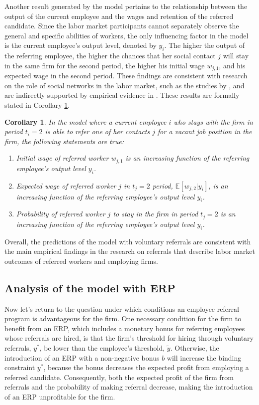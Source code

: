 \documentclass[12pt]{article}
\newtheorem{corollary}[theorem]{Corollary}
\begin{document}
Another result generated by the model pertains to the relationship between the output of the current employee and the wages and retention of the referred candidate. Since the labor market participants cannot separately observe the general and specific abilities of workers, the only influencing factor in the model is the current employee's output level, denoted by $y_i$. The higher the output of the referring employee, the higher the chances that her social contact $j$ will stay in the same firm for the second period, the higher his initial wage $w_{j,1}$, and his expected wage in the second period. These findings are consistent with research on the role of social networks in the labor market, such as the studies by \cite{saloner1985old, simon1992matchmaker}, and are indirectly supported by empirical evidence in \cite{pallais2016referential, lalanne2016old, levati2020impact}. These results are formally stated in Corollary \ref{cor:relation_current_empl}.
\begin{corollary}\label{cor:relation_current_empl}
    In the model where a current employee $i$ who stays with the firm in period $t_i = 2$ is able to refer one of her contacts $j$ for a vacant job position in the firm, the following statements are true:
    \begin{enumerate}[label={\roman*})]
        \item Initial wage of referred worker $w_{j,1}$ is an increasing function of the referring employee's output level $y_i$.
        \item Expected wage of referred worker $j$ in $t_j = 2$ period,  $\mathbb{E}[w_{j,2}|y_i]$, is an increasing function of the referring employee's output level $y_i$.
        \item Probability of referred worker $j$ to stay in the firm in period $t_j = 2$ is an increasing function of the referring employee's output level $y_i$.
    \end{enumerate}
\end{corollary}

Overall, the predictions of the model with voluntary referrals are consistent with the main empirical findings in the research on referrals that describe labor market outcomes of referred workers and employing firms. 

\subsection{Analysis of the model with ERP}

Now let's return to the question under which conditions an employee referral program is advantageous for the firm. One necessary condition for the firm to benefit from an ERP, which includes a monetary bonus for referring employees whose referrals are hired, is that the firm's threshold for hiring through voluntary referrals, $y^*$, be lower than the employee's threshold, $\tilde{y}$. Otherwise, the introduction of an ERP with a non-negative bonus $b$ will increase the binding constraint $y^*$, because the bonus decreases the expected profit from employing a referred candidate. Consequently, both the expected profit of the firm from referrals and the probability of making referral decrease, making the introduction of an ERP unprofitable for the firm.
\end{document}
